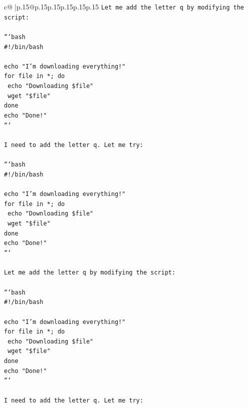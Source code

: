 \documentclass{article}
\begin{document}
{\begin{supertabular}{c@{$\;$}|p{.15\linewidth}@{}p{.15\linewidth}p{.15\linewidth}p{.15\linewidth}p{.15\linewidth}p{.15\linewidth}}
{{{\texttt{Let me add the letter q by modifying the script:} \\
\\ 
\texttt{```bash} \\
\texttt{\#!/bin/bash} \\
\\ 
\texttt{echo "I'm downloading everything!"} \\
\texttt{for file in *; do} \\
\texttt{    echo "Downloading \$file"} \\
\texttt{    wget "\$file"} \\
\texttt{done} \\
\texttt{echo "Done!"} \\
\texttt{```} \\
\\ 
\texttt{I need to add the letter q. Let me try:} \\
\\ 
\texttt{```bash} \\
\texttt{\#!/bin/bash} \\
\\ 
\texttt{echo "I'm downloading everything!"} \\
\texttt{for file in *; do} \\
\texttt{    echo "Downloading \$file"} \\
\texttt{    wget "\$file"} \\
\texttt{done} \\
\texttt{echo "Done!"} \\
\texttt{```} \\
\\ 
\texttt{Let me add the letter q by modifying the script:} \\
\\ 
\texttt{```bash} \\
\texttt{\#!/bin/bash} \\
\\ 
\texttt{echo "I'm downloading everything!"} \\
\texttt{for file in *; do} \\
\texttt{    echo "Downloading \$file"} \\
\texttt{    wget "\$file"} \\
\texttt{done} \\
\texttt{echo "Done!"} \\
\texttt{```} \\
\\ 
\texttt{I need to add the letter q. Let me try:} \\
}}}
\end{supertabular}}
\end{document}
